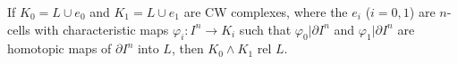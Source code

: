 If $K_0 = L \cup e_0$ and $K_1 = L \cup e_1$ are CW complexes, where the $e_i$ ($i = 0, 1$) are $n$-cells with characteristic maps $\varphi_i: I^n \to K_i$ such that $\varphi_0 | \partial I^n$ and $\varphi_1 | \partial I^n$ are homotopic maps of $\partial I^n$ into $L$, then $K_0 \wedge K_1$ rel $L$.
